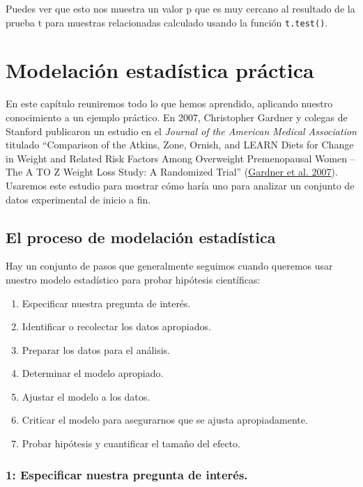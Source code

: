 \documentclass[
  12pt,
]{book}
\providecommand{\tightlist}{%
  \setlength{\itemsep}{0pt}\setlength{\parskip}{0pt}}
\begin{document}
Puedes ver que esto nos muestra un valor p que es muy cercano al resultado de la prueba t para muestras relacionadas calculado usando la función \texttt{t.test()}.

\hypertarget{practical-example}{%
\chapter{Modelación estadística práctica}\label{practical-example}}

En este capítulo reuniremos todo lo que hemos aprendido, aplicando nuestro conocimiento a un ejemplo práctico. En 2007, Christopher Gardner y colegas de Stanford publicaron un estudio en el \emph{Journal of the American Medical Association} titulado ``Comparison of the Atkins, Zone, Ornish, and LEARN Diets for Change in Weight and Related Risk Factors Among Overweight Premenopausal Women -- The A TO Z Weight Loss Study: A Randomized Trial'' (\protect\hyperlink{ref-gard:kiaz:alha:2007}{Gardner et al. 2007}). Usaremos este estudio para mostrar cómo haría uno para analizar un conjunto de datos experimental de inicio a fin.

\hypertarget{el-proceso-de-modelaciuxf3n-estaduxedstica}{%
\section{El proceso de modelación estadística}\label{el-proceso-de-modelaciuxf3n-estaduxedstica}}

Hay un conjunto de pasos que generalmente seguimos cuando queremos usar nuestro modelo estadístico para probar hipótesis científicas:

\begin{enumerate}
\def\labelenumi{\arabic{enumi}.}
\tightlist
\item
  Especificar nuestra pregunta de interés.
\item
  Identificar o recolectar los datos apropiados.
\item
  Preparar los datos para el análisis.
\item
  Determinar el modelo apropiado.
\item
  Ajustar el modelo a los datos.
\item
  Criticar el modelo para asegurarnos que se ajusta apropiadamente.
\item
  Probar hipótesis y cuantificar el tamaño del efecto.
\end{enumerate}

\hypertarget{especificar-nuestra-pregunta-de-interuxe9s.}{%
\subsection{1: Especificar nuestra pregunta de interés.}\label{especificar-nuestra-pregunta-de-interuxe9s.}}
\end{document}
